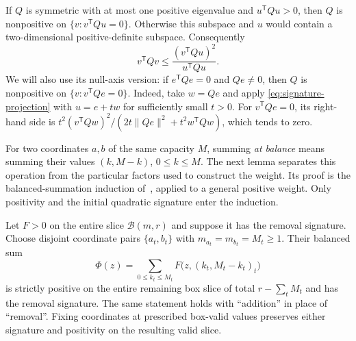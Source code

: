 If $Q$ is symmetric with at most one positive eigenvalue and
$u^{\mathsf T}Qu>0$, then $Q$ is nonpositive on
$\{v:v^{\mathsf T}Qu=0\}$.  Otherwise this subspace and $u$ would
contain a two-dimensional positive-definite subspace.  Consequently
\begin{equation}
 v^{\mathsf T}Qv\le
 \frac{(v^{\mathsf T}Qu)^2}{u^{\mathsf T}Qu}.
 \label{eq:signature-projection}
\end{equation}
We will also use its null-axis version: if
$e^{\mathsf T}Qe=0$ and $Qe\ne0$, then $Q$ is nonpositive on
$\{v:v^{\mathsf T}Qe=0\}$.  Indeed, take $w=Qe$ and apply
\eqref{eq:signature-projection} with $u=e+tw$ for sufficiently
small $t>0$.  For $v^{\mathsf T}Qe=0$, its right-hand side is
$t^2(v^{\mathsf T}Qw)^2/(2t\|Qe\|^2+t^2w^{\mathsf T}Qw)$,
which tends to zero.

For two coordinates $a,b$ of the same capacity $M$, summing
\emph{at balance} means summing their values $(k,M-k)$,
$0\le k\le M$.  The next lemma separates this operation from the
particular factors used to construct the weight.
Its proof is the balanced-summation induction
of~\cite[Section~3, Lemma~3.1, ``Integer signature under balanced
summation'']{CB}, applied to a general positive weight.
Only positivity and the initial quadratic signature enter the induction.

\begin{lemma}
\label{lem:balanced-summation}
Let $F>0$ on the entire slice $\mathcal B(m,r)$ and suppose it has
the removal signature.  Choose disjoint coordinate pairs
$\{a_t,b_t\}$ with $m_{a_t}=m_{b_t}=M_t\ge1$.
Their balanced sum
\[
 \Phi(z)=\sum_{0\le k_t\le M_t}
 F\bigl(z,(k_t,M_t-k_t)_t\bigr)
\]
is strictly positive on the entire remaining box slice of total
$r-\sum_tM_t$ and has the removal signature.
The same statement holds with ``addition'' in place of ``removal''.
Fixing coordinates at prescribed box-valid values preserves either
signature and positivity on the resulting valid slice.
\end{lemma}

